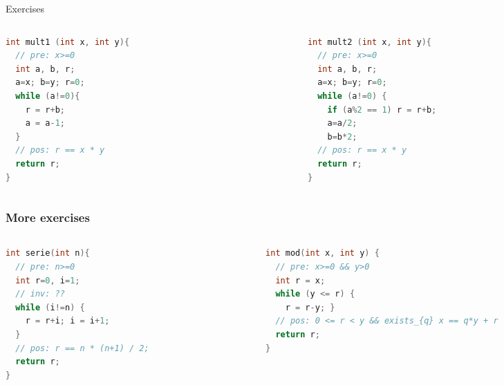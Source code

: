 \documentclass[aspectratio=169]{beamer}
\begin{document}
\begin{frame}[fragile]{Exercises}
  
\begin{columns}
\begin{column}{0.48\textwidth}
\begin{lstlisting}[language=C++]
int mult1 (int x, int y){
  // pre: x>=0
  int a, b, r;
  a=x; b=y; r=0;
  while (a!=0){
    r = r+b;
    a = a-1;
  }
  // pos: r == x * y 
  return r;
}
\end{lstlisting}
\end{column}
\begin{column}{0.48\textwidth}
\begin{lstlisting}[language=C++]
int mult2 (int x, int y){
  // pre: x>=0
  int a, b, r;
  a=x; b=y; r=0;
  while (a!=0) {
    if (a%2 == 1) r = r+b;
    a=a/2;
    b=b*2;
  // pos: r == x * y
  return r;
}
\end{lstlisting}
\end{column}
\end{columns}

%
\end{frame}
\exerciseBack


\begin{frame}[fragile]\frametitle{More exercises}

\begin{columns}
\begin{column}{0.48\textwidth}
\begin{lstlisting}[language=C++]
int serie(int n){
  // pre: n>=0
  int r=0, i=1;
  // inv: ??
  while (i!=n) {
    r = r+i; i = i+1;
  }
  // pos: r == n * (n+1) / 2;
  return r;
}
\end{lstlisting}
\end{column}
\begin{column}{0.48\textwidth}
\begin{lstlisting}[language=C++]
int mod(int x, int y) {
  // pre: x>=0 && y>0
  int r = x;
  while (y <= r) {
    r = r-y; }
  // pos: 0 <= r < y && exists_{q} x == q*y + r
  return r;
}
\end{lstlisting}
\end{column}
\end{columns}

\end{frame}
\end{document}
